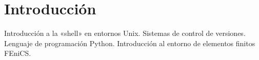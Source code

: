 
\section{Introducción}

\begin{contenidos}
  Introducción a la «shell» en entornos Unix. Sistemas
  de control de versiones. Lenguaje de programación
  Python. Introducción al entorno de elementos finitos
  FEniCS.
\end{contenidos}



